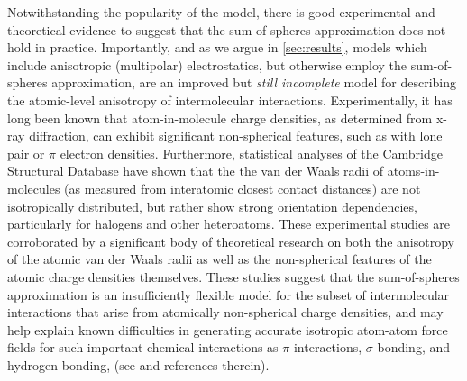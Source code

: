 Notwithstanding the popularity of the model, there is good experimental and
theoretical evidence to suggest that the sum-of-spheres approximation does not
hold in practice.\cite{stone2013theory,Stone1988,Price2000} 
Importantly, and as we argue in
\cref{sec:results}, models which include anisotropic (multipolar) electrostatics, but
otherwise employ the sum-of-spheres approximation, are an improved but
\emph{still incomplete} model for
describing the atomic-level anisotropy of intermolecular interactions.
Experimentally, it has long been known that 
atom-in-molecule charge densities, as determined from x-ray diffraction, can exhibit significant
non-spherical features, such as with lone pair or $\pi$ electron
densities.\cite{Coppens1979} Furthermore, statistical analyses of the
Cambridge Structural Database 
have shown that the the van der Waals radii of atoms-in-molecules (as measured
from interatomic closest contact distances)
are not isotropically
distributed, but rather show strong orientation dependencies, particularly for
halogens and other heteroatoms.
\cite{Bondi1964,Nyburg1985,Batsanov2001,Auffinger2004,Lommerse1996,Eramian2013} 
These experimental studies are corroborated by a significant body of
theoretical research on both the anisotropy of the atomic van der Waals radii
as well as the non-spherical features of the atomic charge densities themselves.
\cite{Wheatley2012,Kramer2014,Lommerse1996, Badenhoop1997a,Kim2014b,Bankiewicz2012}
These studies suggest
that the sum-of-spheres approximation is an insufficiently
flexible model for the subset of intermolecular interactions that arise from
atomically non-spherical charge
densities, and may help explain known difficulties in generating accurate
isotropic atom-atom force fields for such important chemical interactions as 
$\pi$-interactions,\cite{Chessari2002,Sponer2013,Sherrill2009}
$\sigma$-bonding,\cite{Bartocci2015,Rendine2011,Politzer2008}
and hydrogen bonding,\cite{Cisneros2016a}
(see  and references therein).

